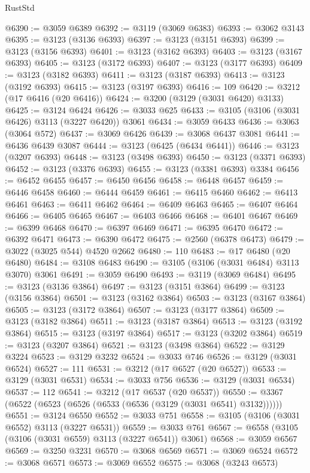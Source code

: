 \begin{lexlean}{RustStd}
\begin{coremodule}
@6390 := @3059 @6389
@6392 := @3119 (@3069 @6383)
@6393 := @3062 @3143
@6395 := @3123 (@3136 @6393)
@6397 := @3123 (@3151 @6393)
@6399 := @3123 (@3156 @6393)
@6401 := @3123 (@3162 @6393)
@6403 := @3123 (@3167 @6393)
@6405 := @3123 (@3172 @6393)
@6407 := @3123 (@3177 @6393)
@6409 := @3123 (@3182 @6393)
@6411 := @3123 (@3187 @6393)
@6413 := @3123 (@3192 @6393)
@6415 := @3123 (@3197 @6393)
@6416 := 109
@6420 := @3212 (@17 @6416 (@20 @6416))
@6424 := @3200 (@3129 (@3031 @6420) @3133)
@6425 := @3124 @6424
@6426 := @3033 @625
@6433 := @3105 (@3106 (@3031 @6426) @3113 (@3227 @6420)) @3061
@6434 := @3059 @6433
@6436 := @3063 (@3064 @572)
@6437 := @3069 @6426
@6439 := @3068 @6437 @3081
@6441 := @6436 @6439 @3087
@6444 := @3123 (@6425 (@6434 @6441))
@6446 := @3123 (@3207 @6393)
@6448 := @3123 (@3498 @6393)
@6450 := @3123 (@3371 @6393)
@6452 := @3123 (@3376 @6393)
@6455 := @3123 (@3381 @6393) @3384
@6456 := @6452 @6455
@6457 := @6450 @6456
@6458 := @6448 @6457
@6459 := @6446 @6458
@6460 := @6444 @6459
@6461 := @6415 @6460
@6462 := @6413 @6461
@6463 := @6411 @6462
@6464 := @6409 @6463
@6465 := @6407 @6464
@6466 := @6405 @6465
@6467 := @6403 @6466
@6468 := @6401 @6467
@6469 := @6399 @6468
@6470 := @6397 @6469
@6471 := @6395 @6470
@6472 := @6392 @6471
@6473 := @6390 @6472
@6475 := @2560 (@6378 @6473)
@6479 := @3022 (@3025 @544) @4520 @2662
@6480 := 110
@6483 := @17 @6480 (@20 @6480)
@6484 := @3108 @6483
@6490 := @3105 (@3106 (@3031 @6484) @3113 @3070) @3061
@6491 := @3059 @6490
@6493 := @3119 (@3069 @6484)
@6495 := @3123 (@3136 @3864)
@6497 := @3123 (@3151 @3864)
@6499 := @3123 (@3156 @3864)
@6501 := @3123 (@3162 @3864)
@6503 := @3123 (@3167 @3864)
@6505 := @3123 (@3172 @3864)
@6507 := @3123 (@3177 @3864)
@6509 := @3123 (@3182 @3864)
@6511 := @3123 (@3187 @3864)
@6513 := @3123 (@3192 @3864)
@6515 := @3123 (@3197 @3864)
@6517 := @3123 (@3202 @3864)
@6519 := @3123 (@3207 @3864)
@6521 := @3123 (@3498 @3864)
@6522 := @3129 @3224
@6523 := @3129 @3232
@6524 := @3033 @746
@6526 := @3129 (@3031 @6524)
@6527 := 111
@6531 := @3212 (@17 @6527 (@20 @6527))
@6533 := @3129 (@3031 @6531)
@6534 := @3033 @756
@6536 := @3129 (@3031 @6534)
@6537 := 112
@6541 := @3212 (@17 @6537 (@20 @6537))
@6550 := @3367 (@6522 (@6523 (@6526 (@6533 (@6536 (@3129 (@3031 @6541) @3132))))))
@6551 := @3124 @6550
@6552 := @3033 @751
@6558 := @3105 (@3106 (@3031 @6552) @3113 (@3227 @6531))
@6559 := @3033 @761
@6567 := @6558 (@3105 (@3106 (@3031 @6559) @3113 (@3227 @6541)) @3061)
@6568 := @3059 @6567
@6569 := @3250 @3231
@6570 := @3068 @6569
@6571 := @3069 @6524
@6572 := @3068 @6571
@6573 := @3069 @6552
@6575 := @3068 (@3243 @6573)

\end{coremodule}
\end{lexlean}
